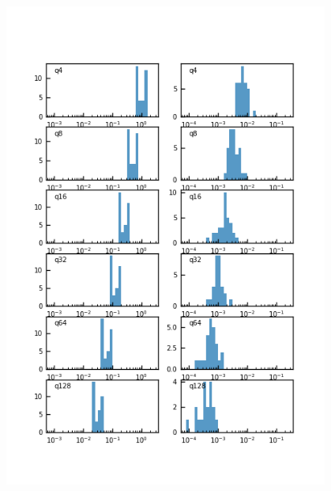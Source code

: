 \begin{figure}[t]
\centering
    \begin{minipage}{.49\textwidth}
        \centering
        \includegraphics[width=0.95\textwidth]{figure/compression_metric_v2.png}
    \end{minipage}
    \begin{minipage}{.49\textwidth}
        \centering

\end{minipage}
\end{figure}
